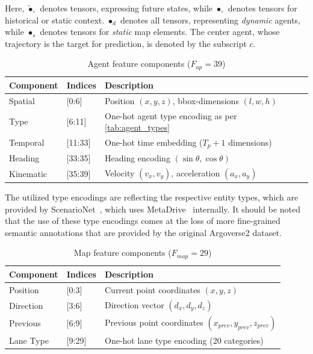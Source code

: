 Here, \( \tilde{\bullet}_{\circ} \) denotes tensors, expressing future states, while \(\bullet_{\circ}\) denotes tensors for historical or static context. \( \bullet_{d} \) denotes all tensors, representing \emph{dynamic} agents, while \(\bullet_{s}\) denotes tensors for \emph{static} map elements. The center agent, whose trajectory is the target for prediction, is denoted by the subscript \(c\).

\begin{table}[H]
\caption{Agent feature components ($F_{ap} = 39$)}
\centering
\begin{tabular}{p{3cm}p{3cm}p{7cm}}
\toprule
\textbf{Component} & \textbf{Indices} & \textbf{Description} \\
\midrule
Spatial & [0:6] & Position \((x, y, z)\), bbox-dimensions \((l, w, h)\) \\
Type & [6:11] & One-hot agent type encoding as per \ref{tab:agent_types}\\
Temporal & [11:33] & One-hot time embedding (\(T_p + 1\) dimensions) \\
Heading & [33:35] & Heading encoding \((\sin\theta, \cos\theta)\) \\
Kinematic & [35:39] & Velocity \((v_x, v_y)\), acceleration \((a_x, a_y)\) \\
\bottomrule
\end{tabular}
\end{table}

The utilized type encodings are reflecting the respective entity types, which are provided by ScenarioNet~\cite{scenarionetLi2023}, which uses MetaDrive~\cite{metadriveLi2022} internally. It should be noted that the use of these type encodings comes at the loss of more fine-grained semantic annotations that are provided by the original Argoverse2 dataset.

\begin{table}[H]
\caption{Map feature components ($F_{map} = 29$)}
\centering
\begin{tabular}{p{3cm}p{3cm}p{7cm}}
\toprule
\textbf{Component} & \textbf{Indices} & \textbf{Description} \\
\midrule
Position & [0:3] & Current point coordinates \((x, y, z)\) \\
Direction & [3:6] & Direction vector \((d_x, d_y, d_z)\) \\
Previous & [6:9] & Previous point coordinates \((x_{prev}, y_{prev}, z_{prev})\) \\
Lane Type & [9:29] & One-hot lane type encoding (20 categories) \\
\bottomrule
\end{tabular}
\end{table}


